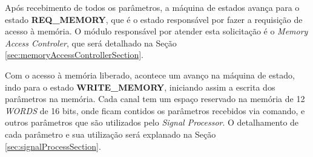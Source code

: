 \documentclass[monografia]{subfiles}
\begin{document}

			Após recebimento de todos os parâmetros, a máquina de estados avança para o estado \textbf{REQ\_MEMORY}, que é o estado responsável 
			por fazer a requisição de acesso à memória. O módulo responsável por atender esta solicitação é o \textit{Memory Access Controler}, 
			que será detalhado na Seção \ref{sec:memoryAccessControllerSection}.

			Com o acesso à memória liberado, acontece um avanço na máquina de estado, indo para o estado \textbf{WRITE\_MEMORY},
			iniciando assim a escrita dos parâmetros na memória. 
			Cada canal tem um espaço reservado na memória de 12 \textit{WORDS} de 16 bits, onde ficam contidos os parâmetros recebidos via comando,
			e outros parâmetros que são utilizados pelo \textit{Signal Processor}. O detalhamento de cada parâmetro e sua utilização será explanado
			na Seção \ref{sec:signalProcessSection}. 
\end{document}
